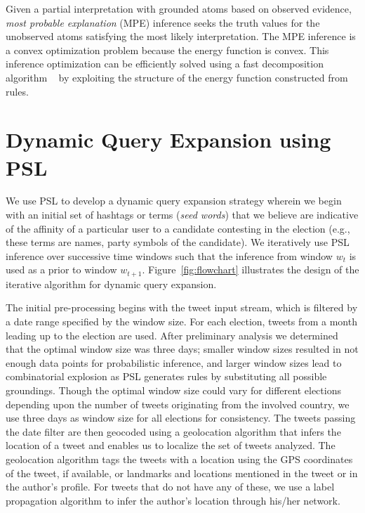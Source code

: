 Given a partial interpretation with grounded atoms based on observed evidence, \emph{most probable explanation} (MPE) inference seeks the truth values for the unobserved atoms satisfying the most likely interpretation. 
The MPE inference is a convex optimization problem because the energy function is convex. 
This inference optimization can be efficiently solved using a fast decomposition algorithm ~\cite{bach2012scaling,bach2013hinge} by exploiting the structure of the energy function constructed from rules.
\section{Dynamic Query Expansion using PSL}
We use PSL to develop a dynamic query expansion strategy wherein we begin with an
initial set of hashtags or terms (\emph{seed words})
that we believe are indicative of the affinity of a
particular user to a candidate contesting in the election (e.g., these terms are names,
party symbols of the candidate).
We iteratively use PSL inference over successive time windows such that the inference 
from window $w_t$ is used as a prior to window $w_{t+1}$.
Figure~\ref{fig:flowchart} illustrates the design of the iterative algorithm for dynamic query expansion.

The initial pre-processing begins with the tweet input stream, which is filtered by a
date range specified by the window size. 
For each election, tweets from a month leading up to the election are used.
After preliminary analysis we determined that the optimal window size was three days;
smaller window sizes resulted in not enough data points for probabilistic inference, and
larger window sizes lead to combinatorial explosion as PSL generates rules by
substituting all possible groundings.
Though the optimal window size could vary for different elections depending upon the number of tweets originating from the involved country, we use three days as window size for all elections 
for consistency. 
The tweets passing the date filter are then geocoded using a geolocation algorithm that infers 
the location of a tweet and enables us to localize the set of tweets analyzed.
The geolocation algorithm tags the tweets with a location using the
GPS coordinates of the tweet, if available, or landmarks and locations mentioned in the tweet 
or in the author's profile. 
For tweets that do not have any of these, we use 
a label propagation algorithm to infer the author's location through his/her network.

